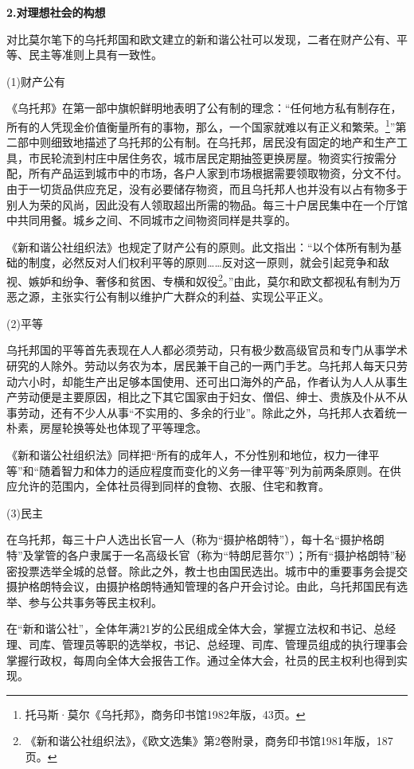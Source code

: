 \par \textbf{2.对理想社会的构想}
\par 对比莫尔笔下的乌托邦国和欧文建立的新和谐公社可以发现，二者在财产公有、平等、民主等准则上具有一致性。
\par (1)财产公有
\par《乌托邦》在第一部中旗帜鲜明地表明了公有制的理念：“任何地方私有制存在，所有的人凭现金价值衡量所有的事物，那么，一个国家就难以有正义和繁荣。\footnote{托马斯·莫尔《乌托邦》，商务印书馆1982年版，43页。}”第二部中则细致地描述了乌托邦的公有制。在乌托邦，居民没有固定的地产和生产工具，市民轮流到村庄中居住务农，城市居民定期抽签更换房屋。物资实行按需分配，所有产品运到城市中的市场，各户人家到市场根据需要领取物资，分文不付。由于一切货品供应充足，没有必要储存物资，而且乌托邦人也并没有以占有物多于别人为荣的风尚，因此没有人领取超出所需的物品。每三十户居民集中在一个厅馆中共同用餐。城乡之间、不同城市之间物资同样是共享的。
\par《新和谐公社组织法》也规定了财产公有的原则。此文指出：“以个体所有制为基础的制度，必然反对人们权利平等的原则……反对这一原则，就会引起竞争和敌视、嫉妒和纷争、奢侈和贫困、专横和奴役\footnote{《新和谐公社组织法》，《欧文选集》第2卷附录，商务印书馆1981年版，187页。}。”由此，莫尔和欧文都视私有制为万恶之源，主张实行公有制以维护广大群众的利益、实现公平正义。
\par (2)平等
\par 乌托邦国的平等首先表现在人人都必须劳动，只有极少数高级官员和专门从事学术研究的人除外。劳动以务农为本，居民兼干自己的一两门手艺。乌托邦人每天只劳动六小时，却能生产出足够本国使用、还可出口海外的产品，作者认为人人从事生产劳动便是主要原因，相比之下其它国家由于妇女、僧侣、绅士、贵族及仆从不从事劳动，还有不少人从事“不实用的、多余的行业”。除此之外，乌托邦人衣着统一朴素，房屋轮换等处也体现了平等理念。
\par 《新和谐公社组织法》同样把“所有的成年人，不分性别和地位，权力一律平等”和“随着智力和体力的适应程度而变化的义务一律平等”列为前两条原则。在供应允许的范围内，全体社员得到同样的食物、衣服、住宅和教育。
\par (3)民主
\par 在乌托邦，每三十户人选出长官一人（称为“摄护格朗特”），每十名“摄护格朗特”及掌管的各户隶属于一名高级长官（称为“特朗尼菩尔”）；所有“摄护格朗特”秘密投票选举全城的总督。除此之外，教士也由国民选出。城市中的重要事务会提交摄护格朗特会议，由摄护格朗特通知管理的各户开会讨论。由此，乌托邦国民有选举、参与公共事务等民主权利。
\par 在“新和谐公社”，全体年满21岁的公民组成全体大会，掌握立法权和书记、总经理、司库、管理员等职的选举权，书记、总经理、司库、管理员组成的执行理事会掌握行政权，每周向全体大会报告工作。通过全体大会，社员的民主权利也得到实现。

